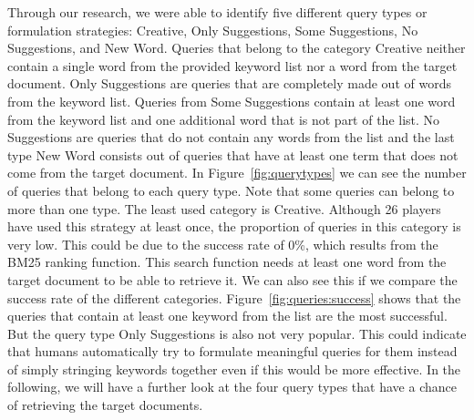 Through our research, we were able to identify five different query types or formulation strategies: Creative, Only Suggestions, Some Suggestions, No Suggestions, and New Word. Queries that belong to the category Creative neither contain a single word from the provided keyword list nor a word from the target document. Only Suggestions are queries that are completely made out of words from the keyword list. Queries from Some Suggestions contain at least one word from the keyword list and one additional word that is not part of the list. No Suggestions are queries that do not contain any words from the list and the last type New Word consists out of queries that have at least one term that does not come from the target document. In Figure~\ref{fig:querytypes} we can see the number of queries that belong to each query type. Note that some queries can belong to more than one type. The least used category is Creative. Although 26 players have used this strategy at least once, the proportion of queries in this category is very low. This could be due to the success rate of 0\%, which results from the BM25 ranking function. This search function needs at least one word from the target document to be able to retrieve it. We can also see this if we compare the success rate of the different categories. Figure~\ref{fig:queries:success} shows that the queries that contain at least one keyword from the list are the most successful. But the query type Only Suggestions is also not very popular. This could indicate that humans automatically try to formulate meaningful queries for them instead of simply stringing keywords together even if this would be more effective.
In the following, we will have a further look at the four query types that have a chance of retrieving the target documents.\par



